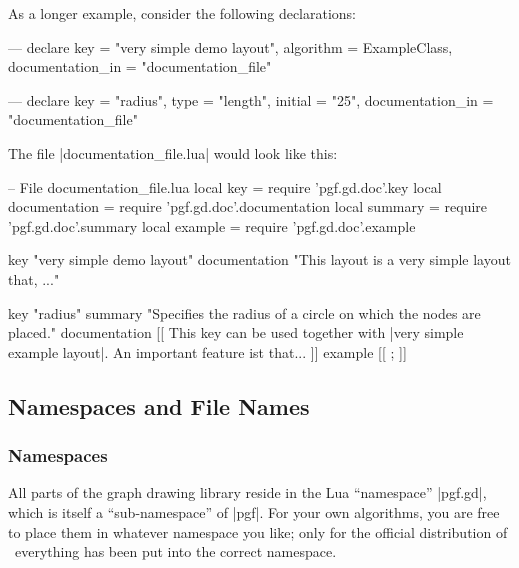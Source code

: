 
As a longer example, consider the following declarations:
%
\begin{codeexample}[code only, tikz syntax=false]
---
declare {
  key               = "very simple demo layout",
  algorithm         = ExampleClass,
  documentation_in  = "documentation_file"
}

---
declare {
  key               = "radius",
  type              = "length",
  initial           = "25",
  documentation_in  = "documentation_file"
}
\end{codeexample}

The file |documentation_file.lua| would look like this:
%
\begin{codeexample}[code only, tikz syntax=false]
-- File documentation_file.lua
local key           = require 'pgf.gd.doc'.key
local documentation = require 'pgf.gd.doc'.documentation
local summary       = require 'pgf.gd.doc'.summary
local example       = require 'pgf.gd.doc'.example

key           "very simple demo layout"
documentation "This layout is a very simple layout that, ..."

key           "radius"
summary       "Specifies the radius of a circle on which the nodes are placed."
documentation
[[
This key can be used together with |very simple example layout|. An
important feature ist that...
]]
example
[[
\tikz {};
]]
\end{codeexample}


\subsection{Namespaces and File Names}
\label{section-gd-namespaces}

\subsubsection{Namespaces}

All parts of the graph drawing library reside in the Lua ``namespace''
|pgf.gd|, which is itself a ``sub-namespace'' of |pgf|. For your own
algorithms, you are free to place them in whatever namespace you like; only for
the official distribution of \pgfname\ everything has been put into the correct
namespace.

